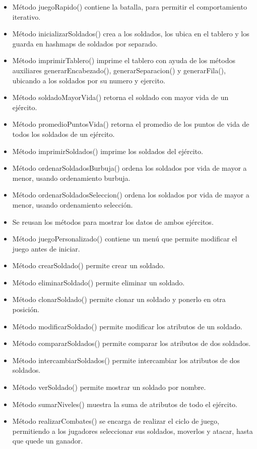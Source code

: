 \documentclass{article}
\begin{document}
\begin{itemize}
	\item Método juegoRapido() contiene la batalla, para permitir el comportamiento iterativo.
	\item Método inicializarSoldados() crea a los soldados, los ubica en el tablero y los guarda en hashmaps de soldados por separado.
	\item Método imprimirTablero() imprime el tablero con ayuda de los métodos auxiliares generarEncabezado(), generarSeparacion() y generarFila(), ubicando a los soldados por su numero y ejercito.
	\item Método soldadoMayorVida() retorna el soldado con mayor vida de un ejército.
	\item Método promedioPuntosVida() retorna el promedio de los puntos de vida de todos los soldados de un ejército.
	\item Método imprimirSoldados() imprime los soldados del ejército.
	\item Método ordenarSoldadosBurbuja() ordena los soldados por vida de mayor a menor, usando ordenamiento burbuja.
	\item Método ordenarSoldadosSeleccion() ordena los soldados por vida de mayor a menor, usando ordenamiento selección.
	\item Se reusan los métodos para mostrar los datos de ambos ejércitos.
	\item Método juegoPersonalizado() contiene un menú que permite modificar el juego antes de iniciar.
	\item Método crearSoldado() permite crear un soldado.
	\item Método eliminarSoldado() permite eliminar un soldado.
	\item Método clonarSoldado() permite clonar un soldado y ponerlo en otra posición.
	\item Método modificarSoldado() permite modificar los atributos de un soldado.
	\item Método compararSoldados() permite comparar los atributos de dos soldados.
	\item Método intercambiarSoldados() permite intercambiar los atributos de dos soldados.
	\item Método verSoldado() permite mostrar un soldado por nombre.
	\item Método sumarNiveles() muestra la suma de atributos de todo el ejército.
	\item Método realizarCombates() se encarga de realizar el ciclo de juego, permitiendo a los jugadores seleccionar sus soldados, moverlos y atacar, hasta que quede un ganador.
\end{itemize}
\pagebreak
\end{document}
